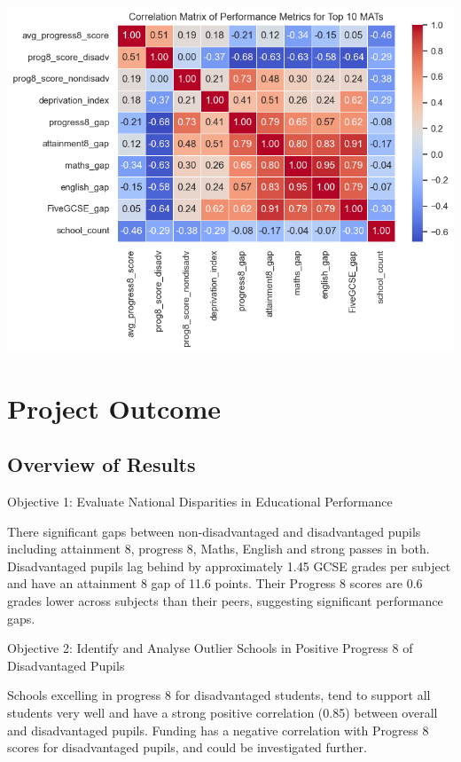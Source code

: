 \documentclass[
  letterpaper,
  DIV=11,
  numbers=noendperiod]{scrartcl}
\begin{document}
\includegraphics{P4DS_A2_Data_Analysis_Project_files/figure-pdf/cell-105-output-1.png}

\section{Project Outcome}\label{project-outcome}

\subsection{Overview of Results}\label{overview-of-results}

Objective 1: Evaluate National Disparities in Educational Performance

There significant gaps between non-disadvantaged and disadvantaged
pupils including attainment 8, progress 8, Maths, English and strong
passes in both. Disadvantaged pupils lag behind by approximately 1.45
GCSE grades per subject and have an attainment 8 gap of 11.6 points.
Their Progress 8 scores are 0.6 grades lower across subjects than their
peers, suggesting significant performance gaps.

Objective 2: Identify and Analyse Outlier Schools in Positive Progress 8
of Disadvantaged Pupils

Schools excelling in progress 8 for disadvantaged students, tend to
support all students very well and have a strong positive correlation
(0.85) between overall and disadvantaged pupils. Funding has a negative
correlation with Progress 8 scores for disadvantaged pupils, and could
be investigated further.
\end{document}
